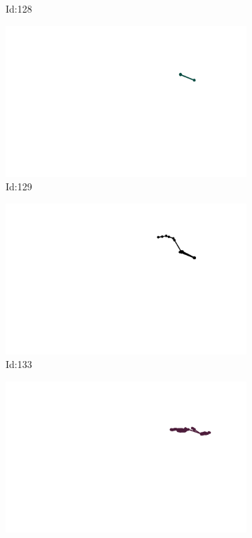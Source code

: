 \documentclass[12pt,twoside]{report}
\begin{document}
\begin{figure}
\begin{subfigure}[b]{0.20\textwidth}
\caption{Id:128}
\end{subfigure}
\begin{subfigure}[b]{0.20\textwidth}
\centering
\includegraphics[width=\textwidth]{../trajectories/129.png}
\caption{Id:129}
\end{subfigure}
\begin{subfigure}[b]{0.20\textwidth}
\centering
\includegraphics[width=\textwidth]{../trajectories/133.png}
\caption{Id:133}
\end{subfigure}
\begin{subfigure}[b]{0.20\textwidth}
\centering
\includegraphics[width=\textwidth]{../trajectories/134.png}

\end{subfigure}
\end{figure}
\end{document}
